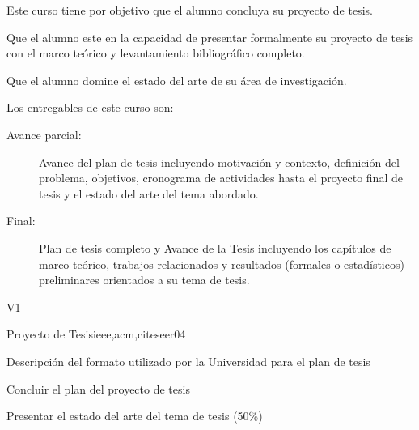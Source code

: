\begin{syllabus}


\begin{justification}
Este curso tiene por objetivo que el alumno concluya su proyecto de tesis.
\end{justification}

\begin{goals}
\item Que el alumno este en la capacidad de presentar formalmente su proyecto de tesis con el marco teórico y levantamiento bibliográfico completo.
\item Que el alumno domine el estado del arte de su área de investigación.
\item Los entregables de este curso son:
	\begin{description}
	\item [Avance parcial:] Avance del plan de tesis incluyendo motivación y contexto, definición del problema, objetivos, cronograma de actividades hasta el proyecto final de tesis y el estado del arte del tema abordado.
	\item [Final:] Plan de tesis completo y Avance de la Tesis incluyendo los capítulos de marco teórico, trabajos relacionados y resultados (formales o estadísticos) preliminares orientados a su tema de tesis.
	\end{description}
\end{goals}

\begin{outcomes}{V1}
\end{outcomes}

\begin{unit}{Proyecto de Tesis}{ieee,acm,citeseer}{0}{4}
\begin{learningoutcomes}
      \item Descripción del formato utilizado por la Universidad para el plan de tesis 
      \item Concluir el plan del proyecto de tesis
      \item Presentar el estado del arte del tema de tesis (50\%)
   \end{learningoutcomes}
\end{unit}


\end{syllabus}
